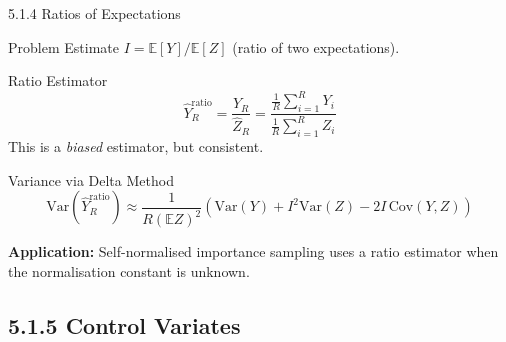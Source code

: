 \documentclass[aspectratio=169,10pt]{beamer}
\begin{document}
\begin{frame}[allowframebreaks]{5.1.4 Ratios of Expectations}

  \begin{block}{Problem}
    Estimate $I = \mathbb{E}[Y] / \mathbb{E}[Z]$ (ratio of two expectations).
  \end{block}

  \begin{block}{Ratio Estimator}
    \[
      \hat{Y}_R^{\mathrm{ratio}} = \frac{\hat{Y}_R}{\hat{Z}_R}
      = \frac{\frac{1}{R}\sum_{i=1}^R Y_i}{\frac{1}{R}\sum_{i=1}^R Z_i}
    \]
    This is a \emph{biased} estimator, but consistent.
  \end{block}

  \begin{block}{Variance via Delta Method}
    \[
      \mathrm{Var}(\hat{Y}_R^{\mathrm{ratio}}) \approx
      \frac{1}{R(\mathbb{E}Z)^2}\left(\mathrm{Var}(Y) + I^2 \mathrm{Var}(Z)
      - 2I\,\mathrm{Cov}(Y,Z)\right)
    \]
  \end{block}

  \textbf{Application:} Self-normalised importance sampling uses a ratio
  estimator when the normalisation constant is unknown.

\end{frame}

\subsection{5.1.5 Control Variates}
\end{document}

